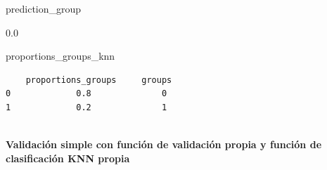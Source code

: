 \documentclass[
  11pt,
  a4paper,
]{article}
\newenvironment{Shaded}{\begin{snugshade}}{\end{snugshade}}
\newcommand{\NormalTok}[1]{#1}
\begin{document}
\begin{Shaded}
\begin{Highlighting}[]
\NormalTok{prediction\_group}
\end{Highlighting}
\end{Shaded}

0.0

\begin{Shaded}
\begin{Highlighting}[]
\NormalTok{proportions\_groups\_knn}
\end{Highlighting}
\end{Shaded}

\begin{verbatim}
    proportions_groups     groups
0             0.8              0
1             0.2              1
 
\end{verbatim}

\newpage

\textbf{Validación simple con función de validación propia y función de
clasificación KNN propia}
\end{document}
